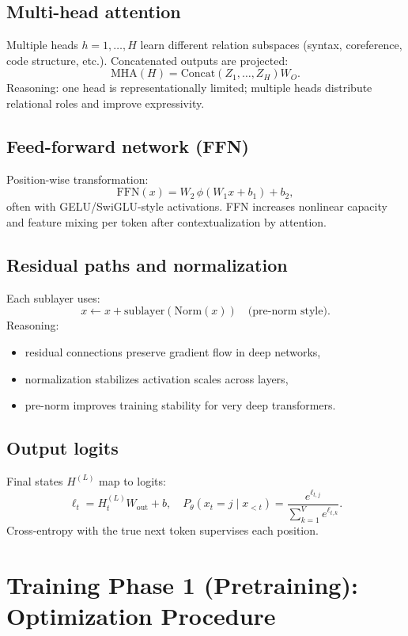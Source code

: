 \documentclass[12pt]{article}
\begin{document}
\subsection{Multi-head attention}

Multiple heads \(h=1,\dots,H\) learn different relation subspaces (syntax, coreference, code structure, etc.). Concatenated outputs are projected:
\[
\text{MHA}(H)=\text{Concat}(Z_1,\dots,Z_H)W_O.
\]
Reasoning: one head is representationally limited; multiple heads distribute relational roles and improve expressivity.

\subsection{Feed-forward network (FFN)}

Position-wise transformation:
\[
\text{FFN}(x)=W_2\,\phi(W_1x+b_1)+b_2,
\]
often with GELU/SwiGLU-style activations. FFN increases nonlinear capacity and feature mixing per token after contextualization by attention.

\subsection{Residual paths and normalization}

Each sublayer uses:
\[
x \leftarrow x + \text{sublayer}(\text{Norm}(x)) \quad \text{(pre-norm style)}.
\]
Reasoning:
\begin{itemize}
    \item residual connections preserve gradient flow in deep networks,
    \item normalization stabilizes activation scales across layers,
    \item pre-norm improves training stability for very deep transformers.
\end{itemize}

\subsection{Output logits}

Final states \(H^{(L)}\) map to logits:
\[
\ell_t = H_t^{(L)} W_{\text{out}} + b,\quad P_\theta(x_t=j\mid x_{<t})=\frac{e^{\ell_{t,j}}}{\sum_{k=1}^{V}e^{\ell_{t,k}}}.
\]
Cross-entropy with the true next token supervises each position.

\section{Training Phase 1 (Pretraining): Optimization Procedure}
\end{document}
